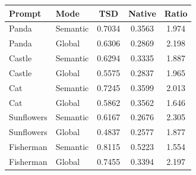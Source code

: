 \begin{tabular}{llccc}
\toprule
Prompt & Mode & TSD & Native & Ratio \\
\midrule
Panda & Semantic & 0.7034 & 0.3563 & 1.974 \\
Panda & Global & 0.6306 & 0.2869 & 2.198 \\
Castle & Semantic & 0.6294 & 0.3335 & 1.887 \\
Castle & Global & 0.5575 & 0.2837 & 1.965 \\
Cat & Semantic & 0.7245 & 0.3599 & 2.013 \\
Cat & Global & 0.5862 & 0.3562 & 1.646 \\
Sunflowers & Semantic & 0.6167 & 0.2676 & 2.305 \\
Sunflowers & Global & 0.4837 & 0.2577 & 1.877 \\
Fisherman & Semantic & 0.8115 & 0.5223 & 1.554 \\
Fisherman & Global & 0.7455 & 0.3394 & 2.197 \\
\bottomrule
\end{tabular}
